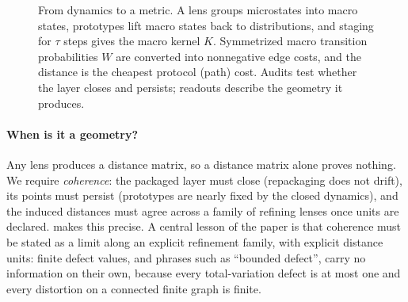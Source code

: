 \begin{figure}[t]
\centering
{}
\caption{From dynamics to a metric. A lens groups microstates into macro states, prototypes lift macro states back to distributions, and staging for $\tau$ steps gives the macro kernel $K$. Symmetrized macro transition probabilities $W$ are converted into nonnegative edge costs, and the distance is the cheapest protocol (path) cost. Audits test whether the layer closes and persists; readouts describe the geometry it produces.}
\label{fig:pipeline}
\end{figure}

\paragraph{When is it a geometry?}
Any lens produces a distance matrix, so a distance matrix alone proves nothing.
We require \emph{coherence}: the packaged layer must close (repackaging does not drift), its points must persist (prototypes are nearly fixed by the closed dynamics), and the induced distances must agree across a family of refining lenses once units are declared.
 makes this precise.
A central lesson of the paper is that coherence must be stated as a limit along an explicit refinement family, with explicit distance units: finite defect values, and phrases such as ``bounded defect'', carry no information on their own, because every total-variation defect is at most one and every distortion on a connected finite graph is finite.

